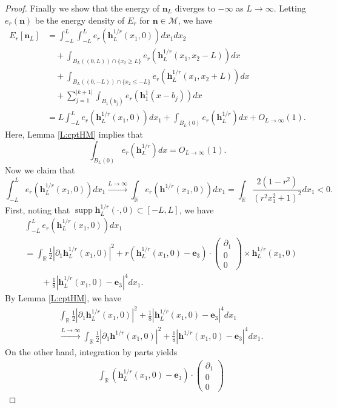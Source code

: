 \documentclass{amsart}
\numberwithin{equation}{section}
\theoremstyle{definition}
\theoremstyle{remark}
\newcommand{\R}{\mathbb{R}}
\DeclareMathOperator{\supp}{supp}
\newcommand{\boM}{\mathcal{M}}
\newcommand{\rd}{{\partial}}								%
\newcommand{\bh}{{\mathbf{h}}}
\newcommand{\bn}{{\mathbf{n}}}
\newcommand{\boe}{{\mathbf{e}}}
\begin{document}
\begin{proof}
Finally we show that the energy of $\bn_L$ diverges to $-\infty$ as $L\to\infty$.
Letting $e_r(\bn)$ be the energy density of $E_r$ for $\bn\in\boM$, we have
\begin{align*}
E_r[\bn_L]  
&=
\int_{-L}^L \int_{-L}^L 
e_r(\bh^{1/r}_L(x_1,0)) dx_1dx_2 
\\
& \quad + \int_{B_L((0,L))\cap \{x_2\ge L\}}
e_r(\bh^{1/r}_{L}(x_1,x_2-L)) dx\\
& \quad +
\int_{B_L((0,-L))\cap \{x_2\le -L\}}
e_r(\bh^{1/r}_{L}(x_1,x_2+L)) dx\\
& \quad +
\sum_{j=1}^{|k+1|} 
\int_{B_1(b_j)}
e_r(\bh^{1}_{1}(x-b_j)) dx\\
&=
L\int_{-L}^L e_r(\bh^{1/r}_L (x_1,0)) dx_1 
+ 
\int_{B_L(0)} e_r(\bh^{1/r}_L)dx + O_{L\to\infty} (1).
\end{align*}
Here, Lemma \ref{L:cptHM} implies that
$$
\int_{B_L(0)} e_r(\bh^{1/r}_L)dx = O_{L\to\infty} (1).
$$
Now we claim that
\begin{equation}\label{eq:3.6}
\int_{-L}^L e_r(\bh^{1/r}_L(x_1,0)) dx_1 \xrightarrow{L\to\infty} 
\int_\R e_r(\bh^{1/r}(x_1,0)) dx_1 
= \int_\R \frac{2(1-r^2)}{(r^2x_1^2+1)^2} dx_1 <0.
\end{equation}
First, noting that $\supp \bh^{1/r}_L(\cdot,0)\subset [-L,L]$, 
we have
\begin{align*}
&\int_{-L}^L e_r(\bh^{1/r}_L(x_1,0)) dx_1\\
&=
\int_{\R} \frac 12 |\rd_{1}\bh^{1/r}_L(x_1,0)|^2 
+
r (\bh^{1/r}_L(x_1,0)-\boe_3)\cdot 
\begin{pmatrix}
\rd_1 \\ 0 \\ 0
\end{pmatrix}
\times 
\bh^{1/r}_L(x_1,0) \\
&\qquad + \frac18 |\bh^{1/r}_L(x_1,0)-\boe_3|^4 dx_1.
\end{align*}
By Lemma \ref{L:cptHM}, we have
\begin{align*}
&\int_{\R} \frac 12 |\rd_{1}\bh^{1/r}_L(x_1,0)|^2 +
\frac18 |\bh^{1/r}_L(x_1,0)-\boe_3|^4 dx_1 \\
&\xrightarrow{L\to\infty} 
\int_{\R} \frac 12 |\rd_{1}\bh^{1/r}(x_1,0)|^2 +
\frac18 |\bh^{1/r}(x_1,0)-\boe_3|^4 dx_1.
\end{align*}
On the other hand, integration by parts yields
\begin{align*}
&\int_{\R} (\bh^{1/r}_L(x_1,0)-\boe_3)\cdot 
\begin{pmatrix}
\rd_1 \\ 0 \\ 0

\end{pmatrix}
\end{align*}
\end{proof}
\end{document}

